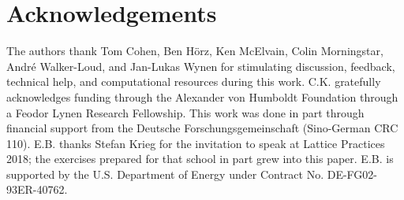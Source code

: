 \section*{Acknowledgements}\label{sec:acknowledgements}

The authors thank
Tom Cohen,
Ben H\"{o}rz,
Ken McElvain,
Colin Morningstar,
Andr\'{e} Walker-Loud,
and
Jan-Lukas Wynen
for stimulating discussion, feedback, technical help, and computational resources during this work.
C.K. gratefully acknowledges funding through the Alexander von Humboldt Foundation through a Feodor Lynen Research Fellowship.
This work was done in part through financial support from the Deutsche Forschungsgemeinschaft (Sino-German CRC 110).
E.B. thanks Stefan Krieg for the invitation to speak at Lattice Practices 2018\cite{lattice-practices}; the exercises\cite{lattice-practices-exercises} prepared for that school in part grew into this paper.
E.B. is supported by the U.S. Department of Energy under Contract No. DE-FG02-93ER-40762.
